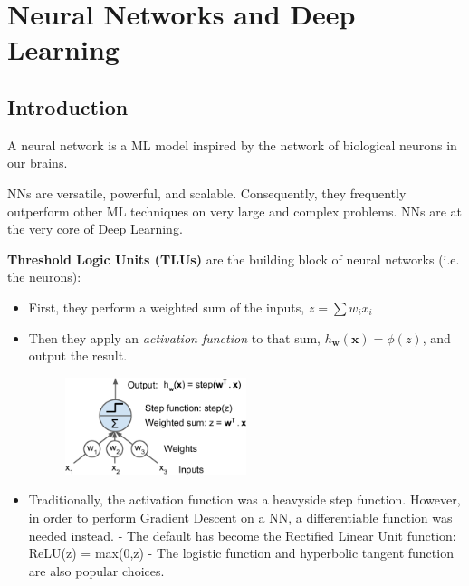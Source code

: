 \section{Neural Networks and Deep Learning}

\subsection{Introduction}

A neural network is a ML model inspired by the network of biological neurons in our brains.

NNs are versatile, powerful, and scalable.
Consequently, they frequently outperform other ML techniques on very large and complex problems.
NNs are at the very core of Deep Learning.

\textbf{Threshold Logic Units (TLUs)} are the building block of neural networks (i.e. the neurons):
\begin{itemize}
\vspace{-4.0mm}

\item
First, they perform a weighted sum of the inputs, $z = \sum w_i x_i$

\item
\vspace{-2.0mm}
Then they apply an \textit{activation function} to that sum, $h_{\boldsymbol{w}}(\boldsymbol{x}) = \phi(z)$, and output the result.\newline
\begin{figure}[ht]
\centering
\includegraphics[width=0.50\textwidth]{./images/TLU.png}
\end{figure}

\item
\vspace{-2.0mm}
Traditionally, the activation function was a heavyside step function.
However, in order to perform Gradient Descent on a NN,
a differentiable function was needed instead.\newline
- The default has become the Rectified Linear Unit function: ReLU(z) = max(0,z)\newline
- The logistic function and hyperbolic tangent function are also popular choices.
\end{itemize}
\vspace{-2.0mm}


